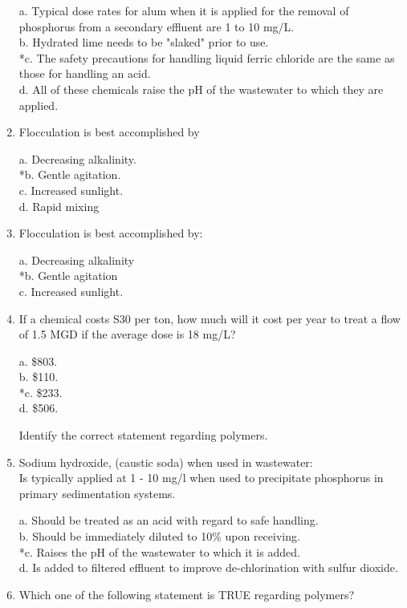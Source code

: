 \begin{enumerate}
a. Typical dose rates for alum when it is applied for the removal of phosphorus from a secondary effluent are 1 to 10 mg/L. \\
b. Hydrated lime needs to be "slaked" prior to use. \\
*c. The safety precautions for handling liquid ferric chloride are the same as those for handling an acid. \\
d. All of these chemicals raise the pH of the wastewater to which they are applied. 

\item  Flocculation is best accomplished by 

a. Decreasing alkalinity. \\
*b. Gentle agitation. \\
c. Increased sunlight. \\
d. Rapid mixing 

\item  Flocculation is best accomplished by: 

a. Decreasing alkalinity \\
*b. Gentle agitation \\
c. Increased sunlight. 

\item  If a chemical costs S30 per ton, how much will it cost per year to treat a flow of 1.5 MGD if the average dose is 18 mg/L? 

a. \$803. \\
b. \$110. \\
*c. \$233. \\
d. \$506.

Identify the correct statement regarding polymers. 

\item  Sodium hydroxide, (caustic soda) when used in wastewater: \\
Is typically applied at 1 - 10 mg/l when used to precipitate phosphorus in primary sedimentation systems. 

a. Should be treated as an acid with regard to safe handling. \\
b. Should be immediately diluted to 10\% upon receiving. \\
*c. Raises the pH of the wastewater to which it is added. \\
d. Is added to filtered effluent to improve de-chlorination with sulfur dioxide. 

\item  Which one of the following statement is TRUE regarding polymers? 


\end{enumerate}
